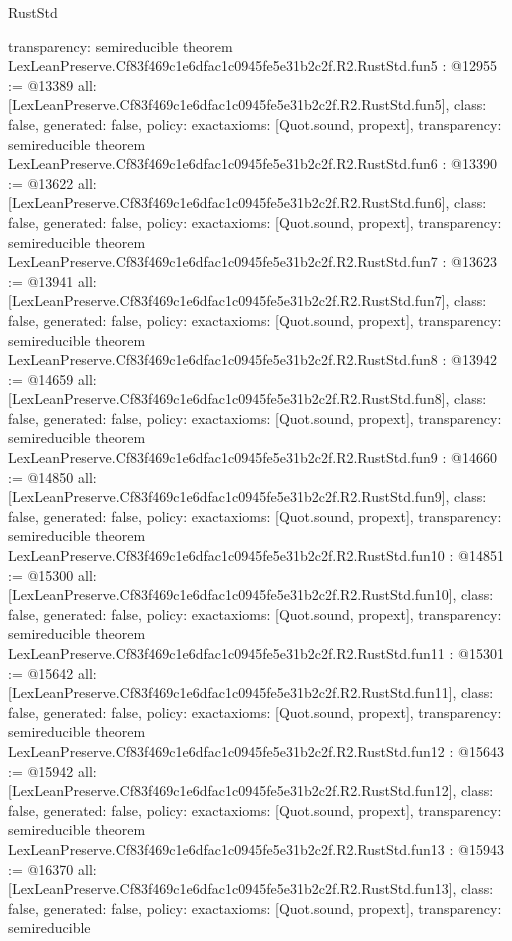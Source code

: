 \begin{lexlean}{RustStd}
\begin{coremodule}
{  transparency: semireducible
}
theorem LexLeanPreserve.Cf83f469c1e6dfac1c0945fe5e31b2c2f.R2.RustStd.fun5 : @12955 := @13389 {
  all: [LexLeanPreserve.Cf83f469c1e6dfac1c0945fe5e31b2c2f.R2.RustStd.fun5],
  class: false,
  generated: false,
  policy: exact{axioms: [Quot.sound, propext]},
  transparency: semireducible
}
theorem LexLeanPreserve.Cf83f469c1e6dfac1c0945fe5e31b2c2f.R2.RustStd.fun6 : @13390 := @13622 {
  all: [LexLeanPreserve.Cf83f469c1e6dfac1c0945fe5e31b2c2f.R2.RustStd.fun6],
  class: false,
  generated: false,
  policy: exact{axioms: [Quot.sound, propext]},
  transparency: semireducible
}
theorem LexLeanPreserve.Cf83f469c1e6dfac1c0945fe5e31b2c2f.R2.RustStd.fun7 : @13623 := @13941 {
  all: [LexLeanPreserve.Cf83f469c1e6dfac1c0945fe5e31b2c2f.R2.RustStd.fun7],
  class: false,
  generated: false,
  policy: exact{axioms: [Quot.sound, propext]},
  transparency: semireducible
}
theorem LexLeanPreserve.Cf83f469c1e6dfac1c0945fe5e31b2c2f.R2.RustStd.fun8 : @13942 := @14659 {
  all: [LexLeanPreserve.Cf83f469c1e6dfac1c0945fe5e31b2c2f.R2.RustStd.fun8],
  class: false,
  generated: false,
  policy: exact{axioms: [Quot.sound, propext]},
  transparency: semireducible
}
theorem LexLeanPreserve.Cf83f469c1e6dfac1c0945fe5e31b2c2f.R2.RustStd.fun9 : @14660 := @14850 {
  all: [LexLeanPreserve.Cf83f469c1e6dfac1c0945fe5e31b2c2f.R2.RustStd.fun9],
  class: false,
  generated: false,
  policy: exact{axioms: [Quot.sound, propext]},
  transparency: semireducible
}
theorem LexLeanPreserve.Cf83f469c1e6dfac1c0945fe5e31b2c2f.R2.RustStd.fun10 : @14851 := @15300 {
  all: [LexLeanPreserve.Cf83f469c1e6dfac1c0945fe5e31b2c2f.R2.RustStd.fun10],
  class: false,
  generated: false,
  policy: exact{axioms: [Quot.sound, propext]},
  transparency: semireducible
}
theorem LexLeanPreserve.Cf83f469c1e6dfac1c0945fe5e31b2c2f.R2.RustStd.fun11 : @15301 := @15642 {
  all: [LexLeanPreserve.Cf83f469c1e6dfac1c0945fe5e31b2c2f.R2.RustStd.fun11],
  class: false,
  generated: false,
  policy: exact{axioms: [Quot.sound, propext]},
  transparency: semireducible
}
theorem LexLeanPreserve.Cf83f469c1e6dfac1c0945fe5e31b2c2f.R2.RustStd.fun12 : @15643 := @15942 {
  all: [LexLeanPreserve.Cf83f469c1e6dfac1c0945fe5e31b2c2f.R2.RustStd.fun12],
  class: false,
  generated: false,
  policy: exact{axioms: [Quot.sound, propext]},
  transparency: semireducible
}
theorem LexLeanPreserve.Cf83f469c1e6dfac1c0945fe5e31b2c2f.R2.RustStd.fun13 : @15943 := @16370 {
  all: [LexLeanPreserve.Cf83f469c1e6dfac1c0945fe5e31b2c2f.R2.RustStd.fun13],
  class: false,
  generated: false,
  policy: exact{axioms: [Quot.sound, propext]},
  transparency: semireducible
}
\end{coremodule}
\end{lexlean}
